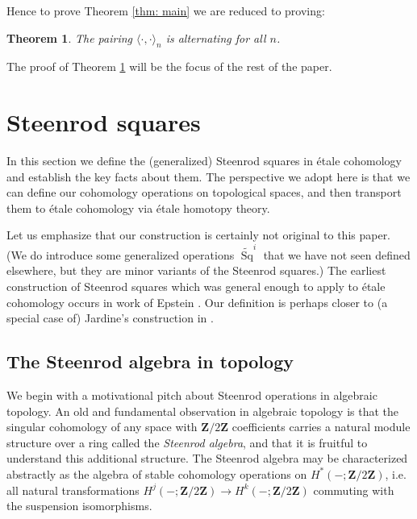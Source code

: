 \documentclass[10pt, reqno]{amsart}
\numberwithin{equation}{subsection}
\newcommand{\wt}[1]{\widetilde{#1}}
\newcommand{\Z}{\mathbf{Z}}
\DeclareMathOperator{\et}{\acute{e}t}
\DeclareMathOperator{\Br}{Br}
\DeclareMathOperator{\Sq}{Sq}
\DeclareMathOperator{\nd}{nd}
\DeclareMathOperator{\tors}{tors}
\newtheorem{thm}{Theorem}[section]
\theoremstyle{remark}
\begin{document}
Hence to prove Theorem \ref{thm: main} we are reduced to proving: 

\begin{thm}\label{thm: pseudo_main}
The pairing $\langle \cdot , \cdot \rangle_n$  is alternating for all $n$. 
\end{thm}

The proof of Theorem \ref{thm: pseudo_main} will be the focus of the rest of the paper. 


\section{Steenrod squares}\label{sec: steenrod}

In this section we define the (generalized) Steenrod squares in  \'{e}tale cohomology and establish the key facts about them. The perspective we adopt here is that we can define our cohomology operations on topological spaces, and then transport them to \'{e}tale cohomology via \'{e}tale homotopy theory. 

Let us emphasize that our construction is certainly not original to this paper. (We do introduce some generalized operations $\wt{\Sq}^i$ that we have not seen defined elsewhere, but they are minor variants of the Steenrod squares.) The earliest construction of Steenrod squares which was general enough to apply to \'{e}tale cohomology occurs in work of Epstein \cite{Eps66}. Our definition is perhaps closer to (a special case of) Jardine's construction in \cite{Jar89}. 


\subsection{The Steenrod algebra in topology}

We begin with a motivational pitch about Steenrod operations in algebraic topology. An old and fundamental observation in algebraic topology is that the singular cohomology of any space with $\Z/2\Z$ coefficients carries a natural module structure over a ring called the \emph{Steenrod algebra}, and that it is fruitful to understand this additional structure. The Steenrod algebra may be characterized abstractly as the algebra of stable cohomology operations on $H^*(-; \Z/2\Z)$, i.e. all natural transformations $H^j(-; \Z/2\Z) \rightarrow H^k(-; \Z/2\Z)$ commuting with the suspension isomorphisms. 
\end{document}
